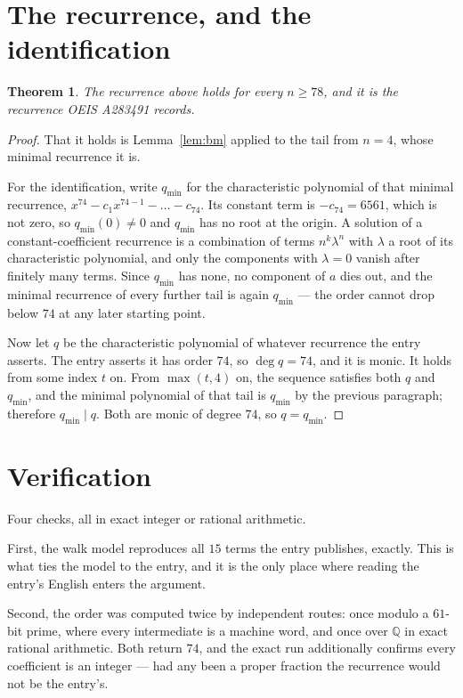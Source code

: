 \documentclass[11pt,a4paper]{article}
\theoremstyle{plain}
\newtheorem{theorem}{Theorem}
\theoremstyle{definition}
\begin{document}
\section{The recurrence, and the identification}

\begin{theorem}
The recurrence above holds for every $n\ge78$, and it is the recurrence OEIS A283491 records.
\end{theorem}

\begin{proof}
That it holds is Lemma~\ref{lem:bm} applied to the tail from $n=4$, whose minimal
recurrence it is.

For the identification, write $q_{\min}$ for the characteristic polynomial of that minimal
recurrence, $x^{74}-c_1x^{74-1}-\dots-c_{74}$. Its constant term is
$-c_{74}=6561$, which is not zero, so $q_{\min}(0)\neq0$ and $q_{\min}$ has no
root at the origin. A solution of a constant-coefficient recurrence is a combination of terms
$n^{k}\lambda^{n}$ with $\lambda$ a root of its characteristic polynomial, and only the
components with $\lambda=0$ vanish after finitely many terms. Since $q_{\min}$ has none, no
component of $a$ dies out, and the minimal recurrence of every further tail is again
$q_{\min}$ --- the order cannot drop below $74$ at any later starting point.

Now let $q$ be the characteristic polynomial of whatever recurrence the entry asserts. The
entry asserts it has order $74$, so $\deg q=74$, and it is monic. It holds from some
index $t$ on. From $\max(t,4)$ on, the sequence satisfies both $q$ and $q_{\min}$, and
the minimal polynomial of that tail is $q_{\min}$ by the previous paragraph; therefore
$q_{\min}\mid q$. Both are monic of degree $74$, so $q=q_{\min}$.
\end{proof}

\section{Verification}

Four checks, all in exact integer or rational arithmetic.

First, the walk model reproduces all $15$ terms the entry publishes, exactly. This is
what ties the model to the entry, and it is the only place where reading the entry's English
enters the argument.

Second, the order was computed twice by independent routes: once modulo a $61$-bit prime, where
every intermediate is a machine word, and once over $\mathbb{Q}$ in exact rational arithmetic.
Both return $74$, and the exact run additionally confirms every coefficient is an integer
--- had any been a proper fraction the recurrence would not be the entry's.
\end{document}

